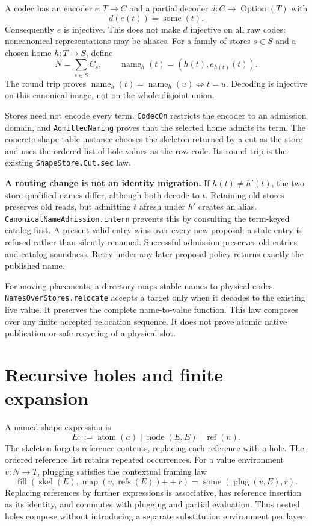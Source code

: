 \documentclass[11pt,a4paper]{article}
\newcommand{\code}[1]{\nolinkurl{#1}}
\begin{document}
A codec has an encoder $e:T\to C$ and a partial decoder
$d:C\to\operatorname{Option}(T)$ with
\[
                 d(e(t))=\operatorname{some}(t).
\]
Consequently $e$ is injective. This does not make $d$ injective on all raw
codes: noncanonical representations may be aliases. For a family of stores
$s\in S$ and a chosen home $h:T\to S$, define
\[
   N=\sum_{s\in S}C_s,\qquad
   \operatorname{name}_h(t)=(h(t),e_{h(t)}(t)).
\]
The round trip proves
$\operatorname{name}_h(t)=\operatorname{name}_h(u)\iff t=u$.
Decoding is injective on this canonical image, not on the whole disjoint union.

Stores need not encode every term. \code{CodecOn} restricts the encoder to an
admission domain, and \code{AdmittedNaming} proves that the selected home
admits its term. The concrete shape-table instance chooses the skeleton
returned by a cut as the store and uses the ordered list of hole values as
the row code. Its round trip is the existing \code{ShapeStore.Cut.sec} law.

\textbf{A routing change is not an identity migration.}
If $h(t)\ne h'(t)$, the two store-qualified names differ, although both decode
to $t$. Retaining old stores preserves old reads, but admitting $t$ afresh
under $h'$ creates an alias. \code{CanonicalNameAdmission.intern} prevents
this by consulting the term-keyed catalog first. A present valid entry wins
over every new proposal; a stale entry is refused rather than silently
renamed. Successful admission preserves old entries and catalog soundness.
Retry under any later proposal policy returns exactly the published name.

For moving placements, a directory maps stable names to physical codes.
\code{NamesOverStores.relocate} accepts a target only when it decodes to the
existing live value. It preserves the complete name-to-value function.
This law composes over any finite accepted relocation sequence. It does not
prove atomic native publication or safe recycling of a physical slot.

\section{Recursive holes and finite expansion}

A named shape expression is
\[
 E ::= \operatorname{atom}(a)\mid\operatorname{node}(E,E)
       \mid\operatorname{ref}(n).
\]
The skeleton forgets reference contents, replacing each reference with a
hole. The ordered reference list retains repeated occurrences. For a value
environment $v:N\to T$, plugging satisfies the contextual framing law
\[
 \operatorname{fill}(\operatorname{skel}(E),
       \operatorname{map}(v,\operatorname{refs}(E))\mathbin{+\!+}r)
 =\operatorname{some}(\operatorname{plug}(v,E),r).
\]
Replacing references by further expressions is associative, has reference
insertion as its identity, and commutes with plugging and partial evaluation.
Thus nested holes compose without introducing a separate substitution
environment per layer.
\end{document}
